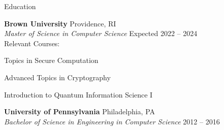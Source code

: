 \documentclass{resume} %
\begin{document}

\begin{grouping}{Education}
    \item {\bf Brown University} \hfill Providence, RI \\
        {\em Master of Science in Computer Science} \hfill Expected 2022 -- 2024 \\
        Relevant Courses:
        \begin{items}
            \item Topics in Secure Computation
            \item Advanced Topics in Cryptography
            \item Introduction to Quantum Information Science I
        \end{items}

    \item {\bf University of Pennsylvania} \hfill Philadelphia, PA \\
        {\em Bachelor of Science in Engineering in Computer Science} \hfill 2012 -- 2016

        \iffalse
            {\em Relevant Courses:}
            \begin{items}
            \item Advanced Topics in Algorithms and Complexity
            \item Internet \& Web Systems
            \item Computer Operating Systems
            \item Introduction to Artificial Intelligence
            \end{items}

        \item {\bf Belmont High School} \hfill Belmont, MA \\
            Cumulative GPA: 3.84 / 4.00 \hfill June 2012
        \fi

\end{grouping}

\end{document}
